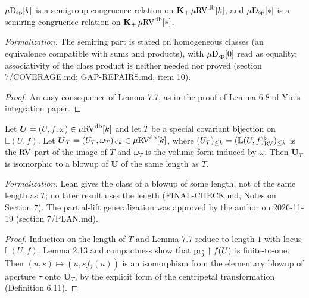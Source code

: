\setcounter{theorem}{9}
\begin{lemma}
\label{isp-congruence-vol}
\leanok
{}
$\mu\mathrm{D}_{\mathrm{sp}}[k]$ is a semigroup congruence relation on $\operatorname{\mathbf{K}_+} \mu\mathrm{RV}^{\operatorname{db}}[k]$, and $\mu\mathrm{D}_{\mathrm{sp}}[*]$ is a semiring congruence relation on $\operatorname{\mathbf{K}_+} \mu\mathrm{RV}^{\operatorname{db}}[*]$.

\emph{Formalization.} The semiring part is stated on homogeneous classes (an equivalence compatible with sums and products), with $\mu\mathrm{D}_{\mathrm{sp}}[0]$ read as equality; associativity of the class product is neither needed nor proved (section 7/COVERAGE.md; GAP-REPAIRS.md, item 10).
\end{lemma}

\begin{proof}
\leanok
An easy consequence of Lemma 7.7, as in the proof of Lemma 6.8 of Yin's integration paper.
\end{proof}

\setcounter{theorem}{10}
\begin{lemma}
\label{special-to-blowup-coa}
\leanok
{}
Let $\boldsymbol{U} = (U, f, \omega) \in \mu\mathrm{RV}^{\operatorname{db}}[k]$ and let $T$ be a special covariant bijection on $\mathbb{L}(U, f)$. Let $\boldsymbol{U}_T = (U_T, \omega_T)_{\leq k} \in \mu\mathrm{RV}^{\operatorname{db}}[k]$, where $(U_T)_{\leq k} = (\mathbb{L}(U, f)^\flat_{\mathrm{RV}})_{\leq k}$ is the $\mathrm{RV}$-part of the image of $T$ and $\omega_T$ is the volume form induced by $\omega$. Then $\boldsymbol{U}_T$ is isomorphic to a blowup of $\boldsymbol{U}$ of the same length as $T$.

\emph{Formalization.} Lean gives the class of a blowup of some length, not of the same length as $T$; no later result uses the length (FINAL-CHECK.md, Notes on Section 7). The partial-lift generalization was approved by the author on 2026-11-19 (section 7/PLAN.md).
\end{lemma}

\begin{proof}
Induction on the length of $T$ and Lemma 7.7 reduce to length $1$ with locus $\mathbb{L}(U, f)$. Lemma 2.13 and compactness show that $\operatorname{pr}_{\tilde j} \upharpoonright f(U)$ is finite-to-one. Then $(u, s) \mapsto (u, s f_j(u))$ is an isomorphism from the elementary blowup of aperture $\tau$ onto $\boldsymbol{U}_T$, by the explicit form of the centripetal transformation (Definition 6.11).
\end{proof}

